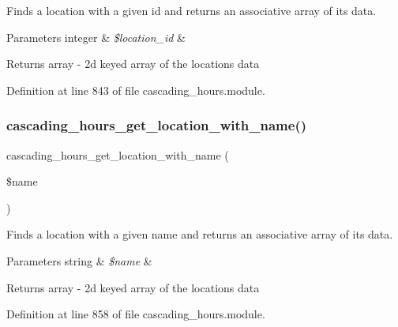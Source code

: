 Finds a location with a given id and returns an associative array of its data. 


\begin{DoxyParams}[1]{Parameters}
integer & {\em \$location\+\_\+id} & \\
\hline
\end{DoxyParams}
\begin{DoxyReturn}{Returns}
array -\/ 2d keyed array of the location\textquotesingle{}s data 
\end{DoxyReturn}


Definition at line 843 of file cascading\+\_\+hours.\+module.

\mbox{\label{cascading__hours_8module_ac7803537daed138b22c6159250ee0488_ac7803537daed138b22c6159250ee0488}} 
\subsubsection{\texorpdfstring{cascading\+\_\+hours\+\_\+get\+\_\+location\+\_\+with\+\_\+name()}{cascading\_hours\_get\_location\_with\_name()}}
{\footnotesize\ttfamily cascading\+\_\+hours\+\_\+get\+\_\+location\+\_\+with\+\_\+name (\begin{DoxyParamCaption}\item[{}]{\$name }\end{DoxyParamCaption})}



Finds a location with a given name and returns an associative array of its data. 


\begin{DoxyParams}[1]{Parameters}
string & {\em \$name} & \\
\hline
\end{DoxyParams}
\begin{DoxyReturn}{Returns}
array -\/ 2d keyed array of the location\textquotesingle{}s data 
\end{DoxyReturn}


Definition at line 858 of file cascading\+\_\+hours.\+module.

